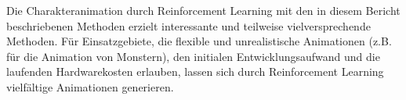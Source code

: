 Die Charakteranimation durch Reinforcement Learning mit den in diesem Bericht beschriebenen Methoden erzielt interessante und teilweise vielversprechende Methoden. Für Einsatzgebiete, die flexible und unrealistische Animationen (z.B. für die Animation von Monstern), den initialen Entwicklungsaufwand und die laufenden Hardwarekosten erlauben, lassen sich durch Reinforcement Learning vielfältige Animationen generieren.

